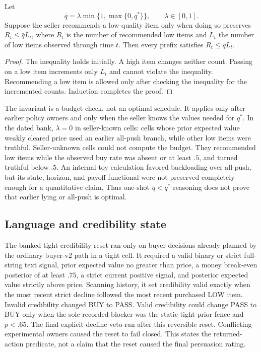 \begin{proposition}
Let
\[
\bar q=\lambda\min\{1,\max\{0,q^*\}\},\qquad \lambda\in[0,1].
\]
Suppose the seller recommends a low-quality item only when doing so preserves
$R_t\leq \bar qL_t$, where $R_t$ is the number of recommended low items and
$L_t$ the number of low items observed through time $t$. Then every prefix
satisfies $R_t\leq \bar qL_t$.
\end{proposition}
\begin{proof}
The inequality holds initially. A high item changes neither count. Passing on a
low item increments only $L_t$ and cannot violate the inequality. Recommending
a low item is allowed only after checking the inequality for the incremented
counts. Induction completes the proof.
\end{proof}

The invariant is a budget check, not an optimal schedule. It applies only after
earlier policy owners and only when the seller knows the values needed for
$q^*$. In the dated bank, $\lambda=0$ in seller-known cells: cells whose prior
expected value weakly cleared price used an earlier all-push branch, while other
low items were truthful.
Seller-unknown cells could not compute the budget. They recommended low items
while the observed buy rate was absent or at least $.5$, and turned truthful
below $.5$. An internal toy calculation favored backloading over all-push, but
its state, horizon, and payoff functional were not preserved completely enough
for a quantitative claim. Thus one-shot $q<q^*$ reasoning does not prove that
earlier lying or all-push is optimal.

\subsection{Language and credibility state}

The banked tight-credibility reset ran only on buyer decisions already planned
by the ordinary buyer-v2 path in a tight cell. It required a valid binary or
strict full-string text signal, prior expected value no greater than price, a
money break-even posterior of at least $.75$, a strict current positive signal,
and posterior expected value strictly above price. Scanning history, it set
credibility valid exactly when the most recent strict decline followed the most
recent purchased LOW item. Invalid credibility changed BUY to PASS. Valid
credibility could change PASS to BUY only when the sole recorded blocker was
the static tight-prior fence and $p<.65$. The final explicit-decline veto ran
after this reversible reset. Conflicting experimental owners caused the reset
to fail closed. This states the returned-action predicate, not a claim that the
reset caused the final persuasion rating.

